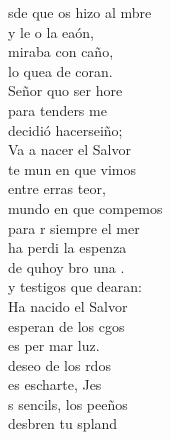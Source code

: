 \begin{cancion}%
	sde que os hizo al mbre\\
	y le o la eaón,\\
	 miraba con caño,\\
	lo quea de coran. \\
	 Señor quo ser hore\\
	para tenders me \\
	decidió hacerseiño;\\
	Va a nacer el Salvor  \\
	te mun en que vimos\\
	entre erras teor,\\
	 mundo en que compemos\\
	para r siempre el mer \\
	 ha perdi la espenza  \\
	de quhoy bro una .\\
	y testigos que dearan:\\
	Ha nacido el Salvor  \\
	 esperan de los cgos\\
	es per mar  luz.\\
	 deseo de los rdos\\
	es escharte, Jes \\
	s sencils, los peeños\\
	desbren tu spland \\

\end{cancion}
